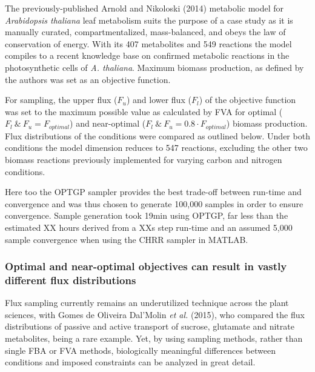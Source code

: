 \documentclass[10pt,letterpaper]{article}
\begin{document}
The previously-published Arnold and Nikoloski (2014) metabolic model for \textit{Arabidopsis thaliana} leaf metabolism suits the purpose of a case study as it is manually curated, compartmentalized, mass-balanced, and obeys the law of conservation of energy. With its 407 metabolites and 549 reactions the model compiles to a recent knowledge base on confirmed metabolic reactions in the photosynthetic cells of \textit{A. thaliana}. Maximum biomass production, as defined by the authors was set as an objective function.

For sampling, the upper flux ($F_u$) and lower flux ($F_l$) of the objective function was set to the maximum possible value as calculated by FVA for optimal ($F_l\ \&\ F_u = F_{optimal}$) and near-optimal ($F_l\ \&\ F_u = 0.8\cdot F_{optimal}$) biomass production. Flux distributions of the conditions were compared as outlined below. Under both conditions the model dimension reduces to 547 reactions, excluding the other two biomass reactions previously implemented for varying carbon and nitrogen conditions. 

Here too the OPTGP sampler provides the best trade-off between run-time and convergence and was thus chosen to generate 100,000 samples in order to ensure convergence. Sample generation took 19min using OPTGP, far less than the estimated XX hours derived from a XXs step run-time and an assumed 5,000 sample convergence when using the CHRR sampler in MATLAB. 

\subsubsection*{Optimal and near-optimal objectives can result in vastly different flux distributions}
Flux sampling currently remains an underutilized technique across the plant sciences, with Gomes de Oliveira Dal’Molin \textit{et al.} (2015), who compared the flux distributions of passive and active transport of sucrose, glutamate and nitrate metabolites, being a rare example. Yet, by using sampling methods, rather than single FBA or FVA methods, biologically meaningful differences between conditions and imposed constraints can be analyzed in great detail. 
\end{document}
